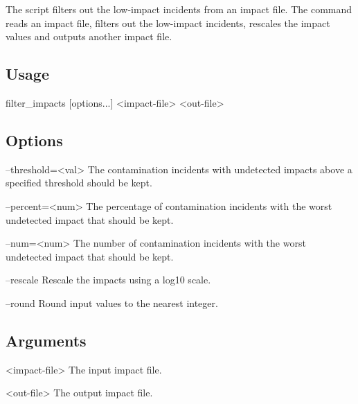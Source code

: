 The  script filters out the low-\/impact incidents from 
an impact file. The  command reads an impact file, filters out the 
low-\/impact incidents, rescales the impact values and outputs another 
impact file.

\subsection{Usage}\label{filter_impactsExecutable_filter_impactsUsage}
\begin{unknownListing}
   filter_impacts [options...] <impact-file> <out-file>
\end{unknownListing}

\subsection{Options}\label{filter_impactsExecutable_filter_impactsOptions}
\begin{unknownListing}
     --threshold=<val>
     The contamination incidents with undetected impacts above a specified threshold should be kept.
     
     --percent=<num>
     The percentage of contamination incidents with the worst undetected impact that should be kept.
     
     --num=<num>    
     The number of contamination incidents with the worst undetected impact that should be kept.

     --rescale
     Rescale the impacts using a log10 scale.
     
     --round
     Round input values to the nearest integer.
\end{unknownListing}

\subsection{Arguments}\label{filter_impactsExecutable_filter_impactsArguments}
\begin{unknownListing}
     <impact-file>
     The input impact file.
     
     <out-file>
     The output impact file.
\end{unknownListing}

%
%
%
